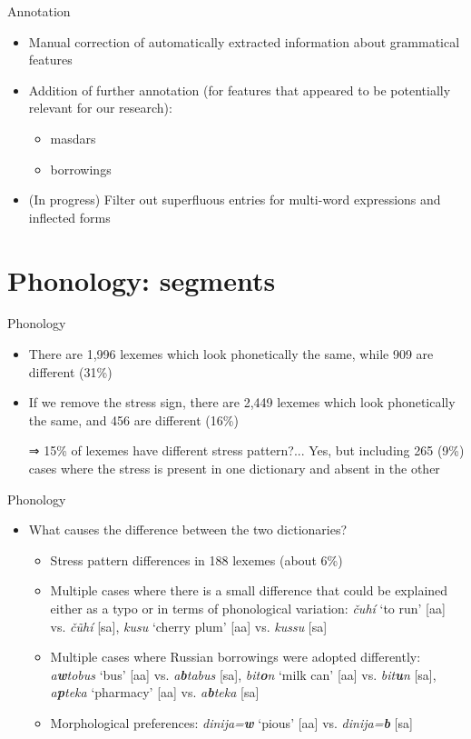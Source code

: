 \begin{frame}{Annotation}
\begin{itemize}
    \item Manual correction of automatically extracted information about grammatical features
    \item Addition of further annotation (for features that appeared to be potentially relevant for our research):
    \begin{itemize}
        \item masdars
        \item borrowings
    \end{itemize}
    \item (In progress) Filter out superfluous entries for multi-word expressions and inflected forms
\end{itemize}
    
\end{frame}

\section{Phonology: segments}
\begin{frame}{Phonology}
\begin{itemize}
    \item There are 1,996 lexemes which look phonetically the same, while 909 are different (31\%)
    \item If we remove the stress sign, there are 2,449 lexemes which look phonetically the same, and 456 are different (16\%)
    \item[⇒] 15\% of lexemes have different stress pattern?... \pause Yes, but including 265 (9\%) cases where the stress is present in one dictionary and absent in the other
\end{itemize}    
\end{frame}

\begin{frame}{Phonology}
\begin{itemize}
    \item What causes the difference between the two dictionaries?
    \begin{itemize}
        \item Stress pattern differences in 188 lexemes (about 6\%)
        \item Multiple cases where there is a small difference that could be explained either as a typo or in terms of phonological variation: \textit{čuhí} ‘to run’ [aa] vs. \textit{čũhí} [sa], \textit{kusu} ‘cherry plum’ [aa] vs. \textit{kussu} [sa]
        \item Multiple cases where Russian borrowings were adopted differently: \textit{a\textbf{w}tobus} ‘bus’ [aa] vs. \textit{a\textbf{b}tabus} [sa], \textit{bit\textbf{o}n} ‘milk can’ [aa] vs. \textit{bit\textbf{u}n} [sa], \textit{a\textbf{p}teka} ‘pharmacy’ [aa] vs. \textit{a\textbf{b}teka} [sa]
        \item Morphological preferences: \textit{dinija=\textbf{w}} ‘pious’ [aa] vs. \textit{dinija=\textbf{b}} [sa]
    \end{itemize}
\end{itemize}
\end{frame}

